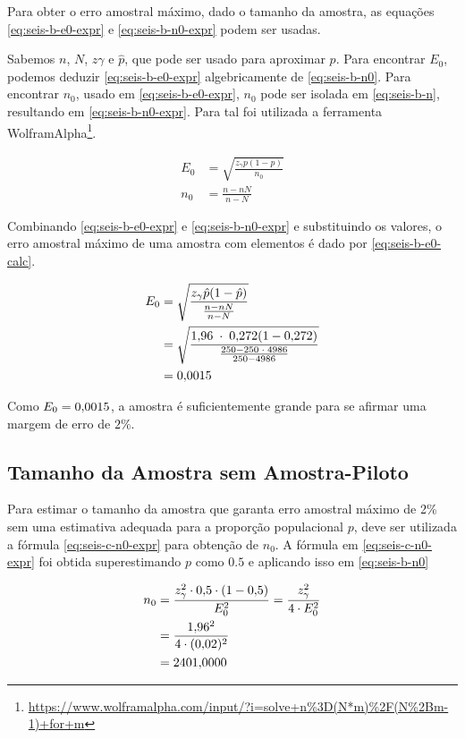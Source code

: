 	Para obter o erro amostral máximo, dado o tamanho da amostra, as equações
	\eqref{eq:seis-b-e0-expr} e \eqref{eq:seis-b-n0-expr} podem ser usadas. 

	Sabemos $n$, $N$, $z\gamma$ e $\hat{p}$, que pode ser usado para aproximar
	$p$. Para encontrar $E_0$, podemos deduzir \eqref{eq:seis-b-e0-expr}
	algebricamente de \eqref{eq:seis-b-n0}. Para encontrar $n_0$, usado em
	\eqref{eq:seis-b-e0-expr}, $n_0$ pode ser isolada em
	\eqref{eq:seis-b-n}, resultando em \eqref{eq:seis-b-n0-expr}. Para tal
	foi utilizada a ferramenta
	WolframAlpha\footnote{\url{https://www.wolframalpha.com/input/?i=solve+n\%3D(N*m)\%2F(N\%2Bm-1)+for+m}}.

	\begin{align}
		E_0 &= \label{eq:seis-b-e0-expr}
			   \sqrt{\frac{z_\gamma p(1 - p) }{n_0}} \\
		n_0 &= \label{eq:seis-b-n0-expr}
			   \frac{n-n N}{n-N}
	\end{align}

	Combinando \eqref{eq:seis-b-e0-expr} e \eqref{eq:seis-b-n0-expr} e
	substituindo os valores, o erro amostral máximo de uma amostra com
	\SEISn elementos é dado por \eqref{eq:seis-b-e0-calc}.

	\begin{align}
		\label{eq:seis-b-e0-calc}
		E_0 &= \sqrt{\frac{z_\gamma \hat{p}(1 - \hat{p}) }{\frac{n-n N}{n - N}}} \\
			&= \sqrt{\frac{\num{1.96} \;\cdot\; \num{0.272} (1 - \num{0.272}) }{\frac{250 - 250 \;\cdot\; 4986}{250 - 4986}}} \nonumber \\
			&= \num{0.0015} \nonumber
	\end{align}

	Como $E_0 = \num{0.0015}$, a amostra é suficientemente grande para se afirmar
	uma margem de erro de $2\%$.

\subsection{Tamanho da Amostra sem Amostra-Piloto}

	Para estimar o tamanho da amostra que garanta erro amostral máximo de 2\%
	sem uma estimativa adequada para a proporção populacional $p$, deve ser
	utilizada a fórmula \eqref{eq:seis-c-n0-expr} para obtenção de $n_0$. A
	fórmula em \eqref{eq:seis-c-n0-expr} foi obtida superestimando $p$ como
	$\num{0.5}$ e aplicando isso em \eqref{eq:seis-b-n0}

	\begin{align}
		n_0 &= \label{eq:seis-c-n0-expr}
			   \frac{z_\gamma^2 \cdot \num{0.5} \cdot (1 - \num{0.5})}{E_0^2} = \frac{z_\gamma^2}{4 \cdot E_0^2} \\
			&= \frac{\num{1.96}^2}{4 \cdot (\num{0.02})^2} \nonumber \\
			&= \label{eq:seis-c-n0-result}
			   \num{2401.0000}
	\end{align}

